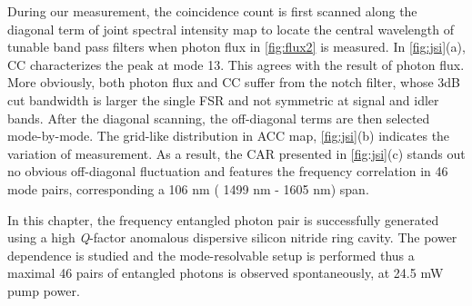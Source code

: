 During our measurement, the coincidence count is first scanned along the diagonal term of joint spectral intensity map to locate the central wavelength of tunable band pass filters when photon flux in \autoref{fig:flux2} is measured. In \autoref{fig:jsi}(a), CC characterizes the peak at mode 13. This agrees with the result of photon flux. More obviously, both photon flux and CC suffer from the notch filter, whose 3dB cut bandwidth is larger the single FSR and not symmetric at signal and idler bands. After the diagonal scanning, the off-diagonal terms are then selected mode-by-mode. The grid-like distribution in ACC map, \autoref{fig:jsi}(b) indicates the variation of measurement.
As a result, the CAR presented in \autoref{fig:jsi}(c) stands out no obvious off-diagonal fluctuation and features the frequency correlation in 46 mode pairs, corresponding a 106 nm ( 1499 nm - 1605 nm) span.

\begin{figure}
	\centering
	
	\label{fig:flux2}
\end{figure}

\begin{figure}
	\centering
	
	\label{fig:jsi}
\end{figure}

\bigskip
In this chapter, the frequency entangled photon pair is successfully generated using a high \textit{Q}-factor anomalous dispersive silicon nitride ring cavity. The power dependence is studied and the mode-resolvable setup is performed thus a maximal 46 pairs of entangled photons is observed spontaneously, at 24.5 mW pump power.

